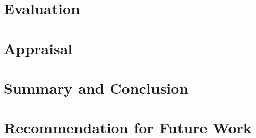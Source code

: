 \documentclass[12pt,a4paper]{report}
\begin{document}
\newpage
\section{Evaluation}
\section{Appraisal}
\section{Summary and Conclusion}
\section{Recommendation for Future Work}
\end{document}
